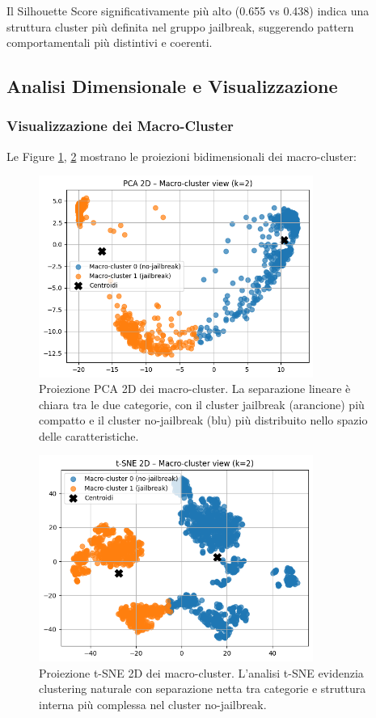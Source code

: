\documentclass[12pt,a4paper]{article}
\begin{document}
Il Silhouette Score significativamente più alto (0.655 vs 0.438) indica una struttura cluster più definita nel gruppo jailbreak, suggerendo pattern comportamentali più distintivi e coerenti.

\subsection{Analisi Dimensionale e Visualizzazione}

\subsubsection{Visualizzazione dei Macro-Cluster}

Le Figure \ref{fig:macro_pca}, \ref{fig:macro_tsne} mostrano le proiezioni bidimensionali dei macro-cluster:

\begin{figure}[H]
    \centering
    \includegraphics[width=0.8\textwidth]{pcatot.png}
    \caption{Proiezione PCA 2D dei macro-cluster. La separazione lineare è chiara tra le due categorie, con il cluster jailbreak (arancione) più compatto e il cluster no-jailbreak (blu) più distribuito nello spazio delle caratteristiche.}
    \label{fig:macro_pca}
\end{figure}

\begin{figure}[H]
    \centering
    \includegraphics[width=0.8\textwidth]{tsnetot.png}
    \caption{Proiezione t-SNE 2D dei macro-cluster. L'analisi t-SNE evidenzia clustering naturale con separazione netta tra categorie e struttura interna più complessa nel cluster no-jailbreak.}
    \label{fig:macro_tsne}
\end{figure}
\end{document}
